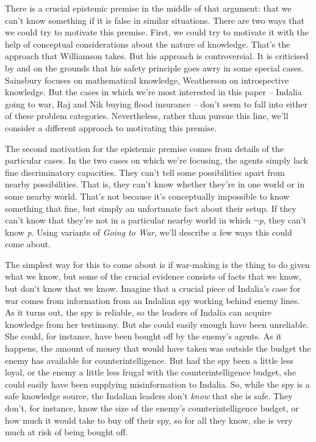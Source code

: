 There is a crucial epistemic premise in the middle of that argument: that we can't know something if it is false in similar situations. There are two ways that we could try to motivate this premise. First, we could try to motivate it with the help of conceptual considerations about the nature of knowledge. That's the approach that Williamson takes. But his approach is controversial. It is criticised by \citet{Sainsbury1996} and \citet{Weatherson2004-WEALMT} on the grounds that his safety principle goes awry in some special cases. Sainsbury focuses on mathematical knowledge, Weatherson on introspective knowledge. But the cases in which we're most interested in this paper -- Indalia going to war, Raj and Nik buying flood insurance -- don't seem to fall into either of these problem categories. Nevertheless, rather than pursue this line, we'll consider a different approach to motivating this premise. 

The second motivation for the epistemic premise comes from details of the particular cases. In the two cases on which we're focusing, the agents simply lack fine discriminatory capacities. They can't tell some possibilities apart from nearby possibilities. That is, they can't know whether they're in one world or in some nearby world. That's not because it's conceptually impossible to know something that fine, but simply an unfortunate fact about their setup. If they can't know that they're not in a particular nearby world in which \(\neg\)\textit{p}, they can't know \textit{p}. Using variants of \textit{Going to War}, we'll describe a few ways this could come about.

The simplest way for this to come about is if war-making is the thing to do given what we know, but some of the crucial evidence consists of facts that we know, but don't know that we know.  Imagine that a crucial piece of Indalia's case for war comes from information from an Indalian spy working behind enemy lines. As it turns out, the spy is reliable, so the leaders of Indalia can acquire knowledge from her testimony. But she could easily enough have been unreliable. She could, for instance, have been bought off by the enemy's agents. As it happens, the amount of money that would have taken was outside the budget the enemy has available for counterintelligence. But had the spy been a little less loyal, or the enemy a little less frugal with the counterintelligence budget, she could easily have been supplying misinformation to Indalia. So, while the spy is a safe knowledge source, the Indalian leaders don't \textit{know} that she is safe. They don't, for instance, know the size of the enemy's counterintelligence budget, or how much it would take to buy off their spy, so for all they know, she is very much at risk of being bought off. 


